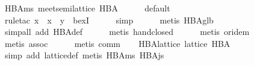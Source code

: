 \begin{isabellebody}
\ HBA{}ms{}\ {}meet{}semilattice\ HBA{}\isanewline
%
\isadelimproof
\ \ \ \ %
\endisadelimproof
%
\isatagproof
{}\isamarkupfalse%
\ default\isanewline
\ \ \ \ \isamarkupfalse%
\ {}\isanewline
\ \ \ \ \isamarkupfalse%
\ {}rule{}tac\ x\ {}\ {}x\ {}\ y{}\ \ bexI{}\isanewline
\ \ \ \ \isamarkupfalse%
\ simp\isanewline
\ \ \ \ \isamarkupfalse%
\ {}metis\ HBA{}glb{}\isanewline
\ \ \ \ \isamarkupfalse%
\ {}simp{}all\ add{}\ HBA{}def{}\isanewline
\ \ \ \ \isamarkupfalse%
\ {}metis\ hand{}closed{}\isanewline
\ \ \ \ \isamarkupfalse%
\ {}metis\ or{}idem{}\isanewline
\ \ \ \ \isamarkupfalse%
\ {}metis\ assoc{}\isanewline
\ \ \ \ \isamarkupfalse%
\ {}metis\ comm{}%
\endisatagproof
{\isafoldproof}%
%
\isadelimproof
\isanewline
%
\endisadelimproof
\isanewline
\ \ \isamarkupfalse%
\ HBA{}lattice{}\ {}lattice\ HBA{}\isanewline
%
\isadelimproof
\ \ \ \ %
\endisadelimproof
%
\isatagproof
{}\isamarkupfalse%
\ {}simp\ add{}\ lattice{}def{}\ metis\ HBA{}ms\ HBA{}js{}%

\end{isabellebody}
